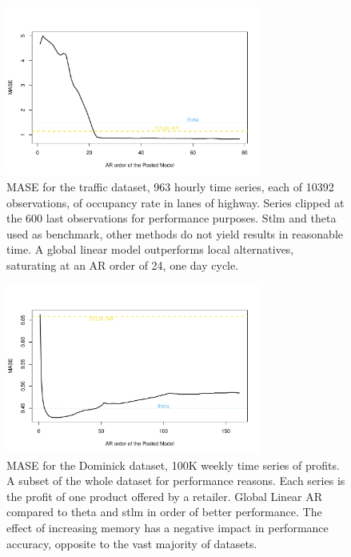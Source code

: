 \documentclass[a4paper]{article}
\theoremstyle{custom}
\begin{document}
\begin{figure}
  \centering
  \includegraphics[width=0.75\textwidth]{fig/traffic.pdf}
  \caption{MASE for the traffic dataset, 963 hourly time series, each of 10392 observations, of occupancy rate in lanes of highway. Series clipped at the 600 last observations for performance purposes. Stlm and theta used as benchmark, other methods do not yield results in reasonable time. A global linear model outperforms local alternatives, saturating at an AR order of 24, one day cycle. }
  \label{fig:traffic}
\end{figure}

\begin{figure}
  \centering
  \includegraphics[width=0.75\textwidth]{fig/dominick.pdf}
  \caption{MASE for the Dominick dataset, 100K weekly time series of profits. A subset of the whole dataset for performance reasons.
  Each series is the profit of one product offered by a retailer.
  Global Linear AR compared to theta and stlm in order of better performance.
  The effect of increasing memory has a negative impact in performance accuracy, opposite to the vast majority of datasets.}
  \label{fig:dominick}
\end{figure}
\end{document}
